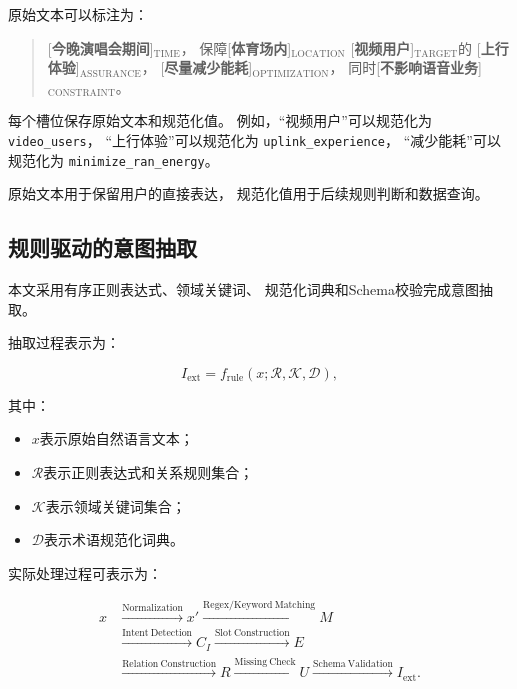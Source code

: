 \documentclass[lang=cn,12pt]{elegantbook}
\begin{document}
原始文本可以标注为：

\begin{quote}
[\textbf{今晚演唱会期间}]$_{\mathrm{TIME}}$，
保障[\textbf{体育场内}]$_{\mathrm{LOCATION}}$
[\textbf{视频用户}]$_{\mathrm{TARGET}}$的
[\textbf{上行体验}]$_{\mathrm{ASSURANCE}}$，
[\textbf{尽量减少能耗}]$_{\mathrm{OPTIMIZATION}}$，
同时[\textbf{不影响语音业务}]$_{\mathrm{CONSTRAINT}}$。
\end{quote}

每个槽位保存原始文本和规范化值。
例如，“视频用户”可以规范化为
\texttt{video\_users}，
“上行体验”可以规范化为
\texttt{uplink\_experience}，
“减少能耗”可以规范化为
\texttt{minimize\_ran\_energy}。

原始文本用于保留用户的直接表达，
规范化值用于后续规则判断和数据查询。


\subsection*{规则驱动的意图抽取}

本文采用有序正则表达式、领域关键词、
规范化词典和Schema校验完成意图抽取。

抽取过程表示为：

\begin{equation}
I_{\mathrm{ext}}
=
f_{\mathrm{rule}}
\left(
x;
\mathcal{R},
\mathcal{K},
\mathcal{D}
\right),
\label{eq:rule_based_intent_extraction}
\end{equation}

其中：

\begin{itemize}
    \item $x$表示原始自然语言文本；
    \item $\mathcal{R}$表示正则表达式和关系规则集合；
    \item $\mathcal{K}$表示领域关键词集合；
    \item $\mathcal{D}$表示术语规范化词典。
\end{itemize}

实际处理过程可表示为：

\begin{equation}
\begin{aligned}
x
&\xrightarrow{\mathrm{Normalization}}
x'
\xrightarrow{\mathrm{Regex/Keyword\ Matching}}
M
\\
&\xrightarrow{\mathrm{Intent\ Detection}}
C_I
\xrightarrow{\mathrm{Slot\ Construction}}
E
\\
&\xrightarrow{\mathrm{Relation\ Construction}}
R
\xrightarrow{\mathrm{Missing\ Check}}
U
\xrightarrow{\mathrm{Schema\ Validation}}
I_{\mathrm{ext}}.
\end{aligned}
\label{eq:intent_extraction_flow}
\end{equation}
\end{document}
